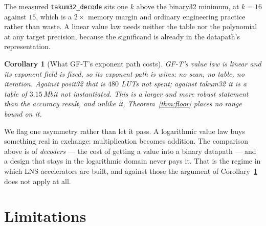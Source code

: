 \documentclass[11pt]{article}
\newtheorem{corollary}{Corollary}
\theoremstyle{definition}
\begin{document}
The measured \texttt{takum32\_decode} sits one $k$ above the binary32 minimum, at
$k = 16$ against $15$, which is a $2\times$ memory margin and ordinary engineering
practice rather than waste. A linear value law needs neither the table nor the
polynomial at any target precision, because the significand is already in the
datapath's representation.

\begin{corollary}[What GF-T's exponent path costs]
\label{cor:zeropath}
GF-T's value law is linear and its exponent field is fixed, so its exponent path
is wires: no scan, no table, no iteration. Against posit32 that is $480$ LUTs not
spent; against takum32 it is a table of $3.15$\,Mbit not instantiated. This is a
larger and more robust statement than the accuracy result, and unlike it,
Theorem~\ref{thm:floor} places no range bound on it.
\end{corollary}

We flag one asymmetry rather than let it pass. A logarithmic value law buys
something real in exchange: multiplication becomes addition. The comparison above
is of \emph{decoders} --- the cost of getting a value into a binary datapath ---
and a design that stays in the logarithmic domain never pays it. That is the
regime in which LNS accelerators are built, and against those the argument of
Corollary~\ref{cor:zeropath} does not apply at all.

\section{Limitations}\label{sec:limits}
\end{document}
